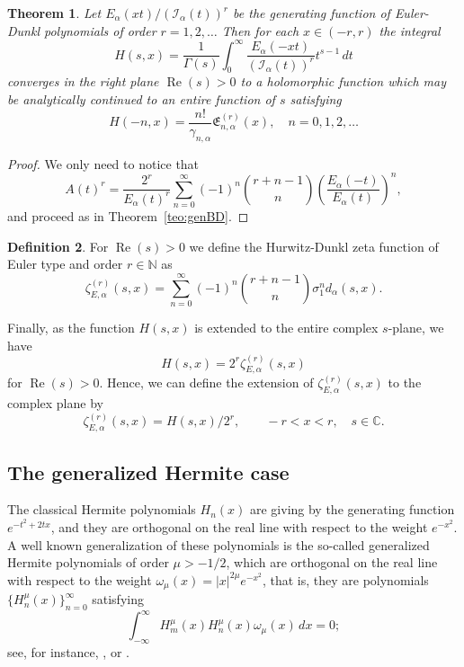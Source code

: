 \documentclass[a4paper]{amsart}
\newcommand{\C}{\mathbb{C}}
\newcommand{\I}{\mathcal{I}}
\newcommand{\Ea}{E_{\alpha}}
\newcommand{\E}{\mathfrak{E}}
\renewcommand{\Re}{\operatorname{Re}}
\theoremstyle{plain}
\newtheorem{theorem}{Theorem}[section]
\theoremstyle{definition}
\newtheorem{definition}[theorem]{Definition}
\theoremstyle{remark}
\numberwithin{equation}{section}
\begin{document}
\begin{theorem}
\label{teo:genED}
Let $\Ea(xt)/(\I_{\alpha}(t))^r$ be the generating function of Euler-Dunkl polynomials of order $r=1,2,\dots$ Then for each $x \in (-r,r)$ the integral
\begin{equation*}
H(s,x) = \frac{1}{\Gamma(s)} \int_{0}^{\infty} 
\frac{\Ea(-xt)}{\left(\I_{\alpha}(t)\right)^r} t^{s-1} \,dt
\end{equation*}
converges in the right plane $\Re(s) > 0$ to a holomorphic function which may be analytically continued to an entire function of $s$ satisfying
\begin{equation*}
  H(-n,x) = \frac{n!}{\gamma_{n,\alpha}} \E_{n,\alpha}^{(r)}(x),\quad n=0,1,2,\dots
\end{equation*}
\end{theorem}

\begin{proof}
We only need to notice that
\[
A(t)^{r} = \frac{2^r}{\Ea(t)^r}
\sum_{n=0}^{\infty} (-1)^n \binom{r+n-1}{n} \left(\frac{\Ea(-t)}{\Ea(t)}\right)^n,
\]
and proceed as in Theorem~\ref{teo:genBD}. 
\end{proof}

\begin{definition}
\label{def:zetaEDr}
For $\Re(s) > 0$ we define the Hurwitz-Dunkl zeta function of Euler type and order $r \in \mathbb{N}$ as
\[
\zeta_{E,\alpha}^{(r)}(s,x) = \sum_{n=0}^{\infty}  (-1)^n \binom{r+n-1}{n} \sigma_1^n d_{\alpha}(s,x).
\]
\end{definition}

Finally, as the function $H(s,x)$ is extended to the entire complex $s$-plane, we have
\begin{equation*}
H(s,x) = 2^r \zeta_{E,\alpha}^{(r)}(s,x)
\end{equation*}
for $\Re(s)>0$. Hence, we can define the extension of $\zeta_{E,\alpha}^{(r)}(s,x)$ to the complex plane by 
\[
  \zeta_{E,\alpha}^{(r)}(s,x) = H(s,x)/2^r,
  \qquad -r<x<r,\quad s \in \C.
\]

\subsection{The generalized Hermite case}
\label{subsec:Her}

The classical Hermite polynomials $H_n(x)$ are giving by the generating function $e^{-t^2+2tx}$, and they are orthogonal on the real line with respect to the weight $e^{-x^2}$. 
A well known generalization of these polynomials is the so-called generalized Hermite polynomials of order $\mu > -1/2$, which are orthogonal on the real line with respect to the weight $\omega_{\mu}(x) = |x|^{2\mu}e^{-x^2}$, that is, they are polynomials $\{H_n^{\mu}(x)\}_{n=0}^{\infty}$ satisfying
\begin{equation*}
    \int_{-\infty}^{\infty} H_m^{\mu}(x) H_n^{\mu}(x)\omega_{\mu}(x)\,dx = 0;
\end{equation*}
see, for instance, \cite{AlS}, \cite[Chapters 1 and~5]{Chi} or \cite[p.~380, problem 25]{Szego}.
\end{document}
